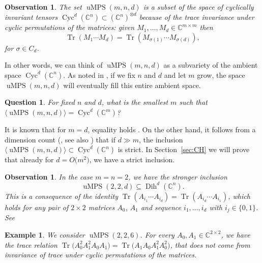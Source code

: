 \documentclass[pdftex]{sigma}
\numberwithin{equation}{section}
\newtheorem{Question}[Theorem]{Question}
\newtheorem{Example}[Theorem]{Example}
\newtheorem{observation}[Theorem]{Observation}
\DeclareMathOperator{\Tr}{Tr}
\newcommand{\CC}{\mathbb{C}}
\DeclareMathOperator{\uMPS}{uMPS}
\DeclareMathOperator{\Cyc}{Cyc}
\DeclareMathOperator{\Dih}{Dih}
\begin{document}
\begin{observation}
The set $\uMPS(m,n,d)$ is a subset of the space of cyclically invariant tensors $\Cyc^d({\mathbb C}^n)\subset ({\mathbb C}^n)^{\otimes d}$ because of the trace invariance under cyclic permutations of the matrices: given $M_1,\dots,M_{d}\in {\mathbb C}^{m \times m}$ then
\[
\Tr(M_1\cdots M_{d})= \Tr(M_{\sigma(1)}\cdots M_{\sigma(d)}),
\]
for $\sigma \in C_d$.
\end{observation}
In other words, we can think of $\uMPS(m,n,d)$ as a subvariety of the ambient space $\Cyc^d({\mathbb C}^n)$. As noted in \cite[Corollary 3.18]{Czaplinski2019UniformMP}, if we fix $n$ and $d$ and let $m$ grow, the space $\uMPS(m,n,d)$ will eventually fill this entire ambient space.
\begin{Question} \label{question:fills}
For fixed $n$ and $d$, what is the smallest $m$ such that $\langle \uMPS(m,n,d) \rangle \!=\! \Cyc^d(\CC^m)$? \end{Question}
It is known that for $m=d$, equality holds \cite[Proposition 3.11]{Czaplinski2019UniformMP}. On the other hand, it follows from a dimension count (\cite[Theorem 3.14]{Czaplinski2019UniformMP}, see also \cite{navascues2018bond}) that if $d \gg m$, the inclusion $\langle \uMPS(m,n,d) \rangle \subset \Cyc^d(\CC^n)$ is strict. In Section~\ref{sec:CH} we will prove that already for  $d=O\big(m^2\big)$, we have a strict inclusion.
\begin{observation}\label{rmk:reflection}
    In the case $m=n=2$, we have the stronger inclusion
\[
    \uMPS(2,2,d) \subseteq \Dih^d(\CC^n).
\]
    This is a consequence of the identity $\Tr(A_{i_1}\cdots A_{i_{d}})= \Tr(A_{i_{d}}\cdots A_{i_1})$, which holds for any pair of $2\times 2$ matrices $A_0$, $A_1$ and sequence $i_1,\dots,i_{d}$ with $i_j \in \{0,1\}$. See \cite[Theorem 1.1]{greene2014traces}
    \end{observation}
\begin{Example}
    We consider $\uMPS(2,2,6)$.
    For every $A_0,A_1\in {\mathbb C}^{2\times 2}$, we have the trace relation
    $\Tr\big(A_0^2A_1^2A_0A_1\big)=\Tr\big(A_1A_0A_1^2A_0^2\big)$, that does not come from invariance of trace under cyclic permutations of the matrices.
\end{Example}
\end{document}
